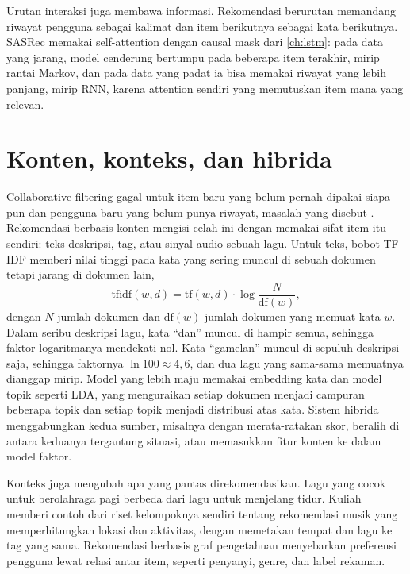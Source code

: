 Urutan interaksi juga membawa informasi. Rekomendasi berurutan memandang riwayat pengguna sebagai kalimat dan item
berikutnya sebagai kata berikutnya. SASRec \citep{kang2018} memakai self-attention dengan causal mask dari \cref{ch:lstm}:
pada data yang jarang, model cenderung bertumpu pada beberapa item terakhir, mirip rantai Markov, dan pada data yang padat
ia bisa memakai riwayat yang lebih panjang, mirip RNN, karena attention sendiri yang memutuskan item mana yang relevan.

\section{Konten, konteks, dan hibrida}

Collaborative filtering gagal untuk item baru yang belum pernah dipakai siapa pun dan pengguna baru yang
belum punya riwayat, masalah yang disebut . Rekomendasi berbasis konten mengisi celah ini
dengan memakai sifat item itu sendiri: teks deskripsi, tag, atau sinyal audio sebuah lagu. Untuk teks,
bobot TF-IDF memberi nilai tinggi pada kata yang sering muncul di sebuah dokumen tetapi jarang di
dokumen lain,
\begin{equation}
\mathrm{tfidf}(w,d)=\mathrm{tf}(w,d)\cdot\log\frac{N}{\mathrm{df}(w)},
\end{equation}
dengan $N$ jumlah dokumen dan $\mathrm{df}(w)$ jumlah dokumen yang memuat kata $w$. Dalam seribu deskripsi lagu,
kata ``dan'' muncul di hampir semua, sehingga faktor logaritmanya mendekati nol. Kata ``gamelan'' muncul di sepuluh
deskripsi saja, sehingga faktornya $\ln100\approx4{,}6$, dan dua lagu yang sama-sama memuatnya dianggap mirip. Model
yang lebih maju memakai embedding kata dan model topik seperti LDA, yang menguraikan setiap dokumen menjadi campuran
beberapa topik dan setiap topik menjadi distribusi atas kata. Sistem hibrida
menggabungkan kedua sumber, misalnya dengan merata-ratakan skor, beralih di antara keduanya tergantung
situasi, atau memasukkan fitur konten ke dalam model faktor.

Konteks juga mengubah apa yang pantas direkomendasikan. Lagu yang cocok untuk berolahraga pagi berbeda
dari lagu untuk menjelang tidur. Kuliah memberi contoh dari riset kelompoknya sendiri tentang
rekomendasi musik yang memperhitungkan lokasi dan aktivitas, dengan memetakan tempat dan lagu ke tag
yang sama. Rekomendasi berbasis graf pengetahuan menyebarkan preferensi pengguna lewat relasi antar
item, seperti penyanyi, genre, dan label rekaman.

